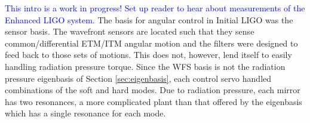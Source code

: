 






\textcolor{blue}{This intro is a work in progress! Set up reader to
  hear about measurements of the Enhanced LIGO system.}
The basis for angular control in Initial LIGO was the sensor
basis. The wavefront sensors are located such that they sense
common/differential ETM/ITM angular motion and the filters were
designed to feed back to those sets of motions. This does not, however,
lend itself to easily handling radiation pressure torque. Since the
WFS basis is not the radiation pressure eigenbasis of Section
\ref{sec:eigenbasis}, each control servo handled combinations of the
soft and hard modes. Due to radiation pressure, each mirror has two
resonances, a more complicated plant than that offered by the
eigenbasis which has a single resonance for each mode.


